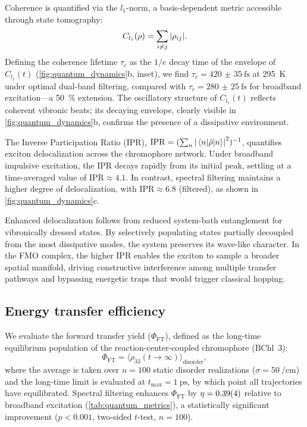 \documentclass[journal=jpcl,manuscript=letter]{achemso}
\begin{document}
Coherence is quantified via the $l_1$-norm,\cite{Baumgratz2014} a basis-dependent metric accessible through state tomography:
\begin{equation}
C_{l_1}(\rho) = \sum_{i \neq j} \abs{\rho_{ij}}.
\label{eq:l1_coherence}
\end{equation}
Defining the coherence lifetime $\tau_c$ as the $1/e$ decay time of the envelope of $C_{l_1}(t)$ (\cref{fig:quantum_dynamics}b, inset), we find $\tau_c = \SI{420(35)}{\femto\second}$ at \SI{295}{\kelvin} under optimal dual-band filtering, compared with $\tau_c = \SI{280(25)}{\femto\second}$ for broadband excitation---a \SI{50}{\percent} extension. The oscillatory structure of $C_{l_1}(t)$ reflects coherent vibronic beats; its decaying envelope, clearly visible in \cref{fig:quantum_dynamics}b, confirms the presence of a dissipative environment.

The Inverse Participation Ratio (IPR), $\mathrm{IPR} = (\sum_n \abs{\mel{n}{\hat{\rho}}{n}}^2)^{-1}$, quantifies exciton delocalization across the chromophore network. Under broadband impulsive excitation, the IPR decays rapidly from its initial peak, settling at a time-averaged value of $\mathrm{IPR} \approx \num{4.1}$. In contrast, spectral filtering maintains a higher degree of delocalization, with $\mathrm{IPR} \approx \num{6.8}$ (filtered), as shown in \cref{fig:quantum_dynamics}c. 

Enhanced delocalization follows from reduced system-bath entanglement for vibronically dressed states. By selectively populating states partially decoupled from the most dissipative modes, the system preserves its wave-like character. In the FMO complex, the higher IPR enables the exciton to sample a broader spatial manifold, driving constructive interference among multiple transfer pathways and bypassing energetic traps that would trigger classical hopping.

\subsection*{Energy transfer efficiency}

We evaluate the forward transfer yield ($\Phi_{\mathrm{FT}}$), defined as the long-time equilibrium population of the reaction-center-coupled chromophore (BChl~3):
\begin{equation}
\Phi_{\mathrm{FT}} = \bigl\langle \rho_{33}(t \to \infty) \bigr\rangle_{\mathrm{disorder}},
\label{eq:ETE}
\end{equation}
where the average is taken over $n=100$ static disorder realizations ($\sigma = \SI{50}{\per\centi\meter}$) and the long-time limit is evaluated at $t_{\max} = \SI{1}{\pico\second}$, by which point all trajectories have equilibrated. Spectral filtering enhances $\Phi_{\mathrm{FT}}$ by $\eta = \num{0.39 \pm 0.04}$ relative to broadband excitation (\cref{tab:quantum_metrics}), a statistically significant improvement ($p < 0.001$, two-sided $t$-test, $n=100$).
\end{document}
